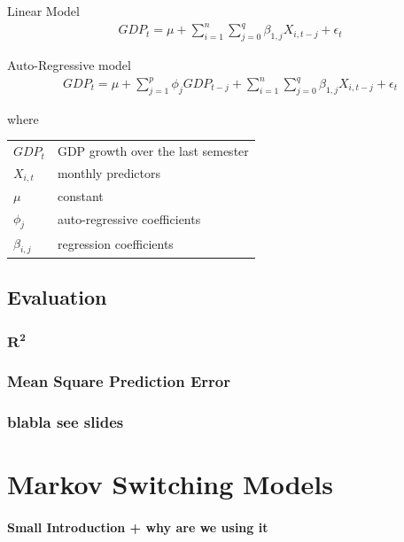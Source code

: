 \documentclass[12pt,a4paper,oneside]{book}
\begin{document}
Linear Model
\begin{eqnarray}
    GDP_{t} = \mu + \sum^n_{i = 1} \sum^q_{j = 0}
       \beta_{1,j} X_{i,t-j} + \epsilon_t 
\end{eqnarray}

Auto-Regressive model
\begin{eqnarray}
    GDP_{t} = \mu + \sum^p_{j = 1} \phi_j GDP_{t-j} +         \sum^n_{i = 1} \sum^q_{j = 0}
       \beta_{1,j} X_{i,t-j} + \epsilon_t 
\end{eqnarray}

where   \\
\begin{tabular}{l l}
    $GDP_t$     & GDP growth over the last semester \\
    $X_{i,t}$   & monthly predictors \\
    $\mu$       & constant \\
    $\phi_j$    & auto-regressive coefficients \\
    $\beta_{i,j}$ & regression coefficients \\
\end{tabular}



\section{Evaluation}

\subsection{$\mathbf{R^2}$}

\subsection{Mean Square Prediction Error}


\subsection{blabla see slides}


\chapter{Markov Switching Models}



\subsubsection{Small Introduction + why are we using it}
\end{document}
